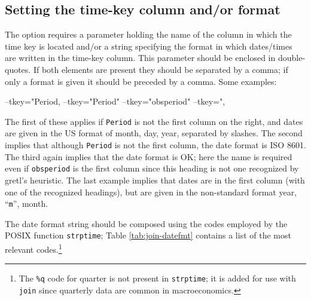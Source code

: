 \subsection{Setting the time-key column and/or format}

The  option requires a parameter holding the name of the
column in which the time key is located and/or a string specifying the
format in which dates/times are written in the time-key column. This
parameter should be enclosed in double-quotes. If both elements are
present they should be separated by a comma; if only a format is given
it should be preceded by a comma. Some examples:

\begin{code}
--tkey="Period,%
--tkey="Period"
--tkey="obsperiod"
--tkey=",%
\end{code}

The first of these applies if \texttt{Period} is not the first column
on the right, and dates are given in the US format of month, day,
year, separated by slashes. The second implies that although
\texttt{Period} is not the first column, the date format is ISO 8601.
The third again implies that the date format is OK; here the name is
required even if \texttt{obsperiod} is the first column since this
heading is not one recognized by gretl's heuristic. The last example
implies that dates are in the first column (with one of the recognized
headings), but are given in the non-standard format year,
``\texttt{m}'', month.

The date format string should be composed using the codes employed by
the POSIX function \texttt{strptime}; Table \ref{tab:join-datefmt}
contains a list of the most relevant codes.\footnote{The
  \texttt{\%q} code for quarter is not present in \texttt{strptime};
  it is added for use with \texttt{join} since quarterly data are
  common in macroeconomics.}

